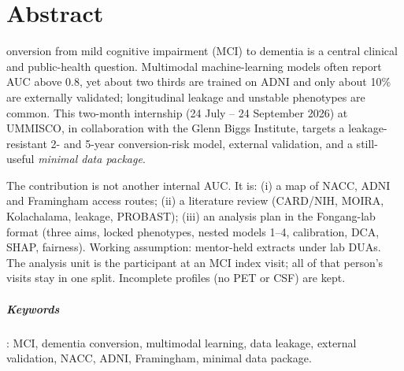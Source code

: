 \chapter*{Abstract}

onversion from mild cognitive impairment (MCI) to dementia is a central clinical and public-health question. Multimodal machine-learning models often report AUC above 0.8, yet about two thirds are trained on ADNI and only about 10\% are externally validated; longitudinal leakage and unstable phenotypes are common. This two-month internship (24 July -- 24 September 2026) at UMMISCO, in collaboration with the Glenn Biggs Institute, targets a leakage-resistant 2- and 5-year conversion-risk model, external validation, and a still-useful \emph{minimal data package}.

The contribution is not another internal AUC. It is: (i) a map of NACC, ADNI and Framingham access routes; (ii) a literature review (CARD/NIH, MOIRA, Kolachalama, leakage, PROBAST); (iii) an analysis plan in the Fongang-lab format (three aims, locked phenotypes, nested models 1--4, calibration, DCA, SHAP, fairness). Working assumption: mentor-held extracts under lab DUAs. The analysis unit is the participant at an MCI index visit; all of that person's visits stay in one split. Incomplete profiles (no PET or CSF) are kept.

\paragraph{Keywords}: MCI, dementia conversion, multimodal learning, data leakage, external validation, NACC, ADNI, Framingham, minimal data package.
